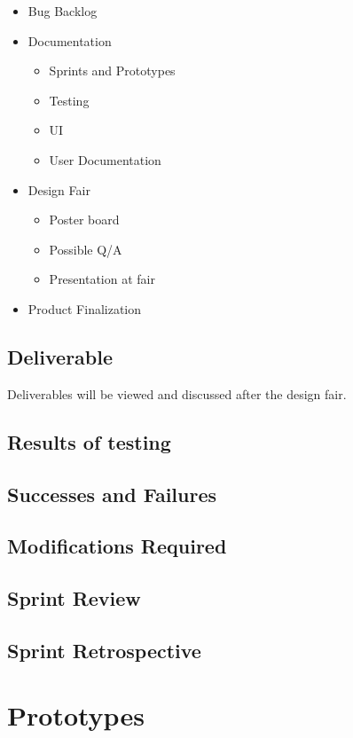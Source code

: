\begin{itemize}
	\item Bug Backlog
	\item Documentation		
	\begin{itemize}
		\item Sprints and Prototypes
		\item Testing
		\item UI
		\item User Documentation
	\end{itemize}
	\item Design Fair	
	\begin{itemize}
    	\item Poster board
    	\item Possible Q/A
    	\item Presentation at fair
	\end{itemize}
	\item Product Finalization
\end{itemize}

\subsection{Deliverable}

Deliverables will be viewed and discussed after the design fair.

\subsection{Results of testing}


\subsection{Successes and Failures}


\subsection{Modifications Required}


\subsection{Sprint Review}


\subsection{Sprint Retrospective}


\section{Prototypes}

